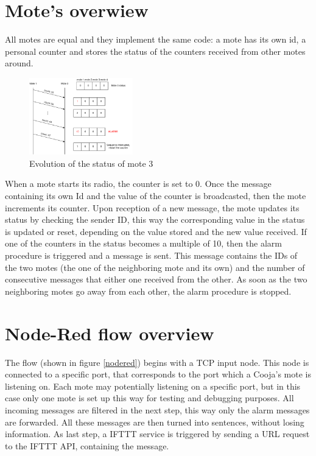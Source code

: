 \documentclass[11pt]{article}
\begin{document}
\section{Mote's overwiew}
All motes are equal and they implement the same code: \newline
a mote has its own id, a personal counter and stores the status of the counters received from other motes around. \newline
\begin{figure}
  \begin{center}
    \includegraphics[width=0.40\textwidth]{status_update_diagram_new.png}
    \caption{Evolution of the status of mote 3}
  \end{center}
\end{figure}
When a mote starts its radio, the counter is set to 0. Once the message containing its own Id and the value of the counter is broadcasted, then the mote increments its counter. \newline
Upon reception of a new message, the mote updates its status by checking the sender ID, this way the corresponding value in the status is updated or reset, depending on the value stored and the new value received. \newline
If one of the counters in the status becomes a multiple of 10, then the alarm procedure is triggered and a message is sent. This message contains the IDs of the two motes (the one of the neighboring mote and its own) and the number of consecutive messages that either one received from the other. \newline
As soon as the two neighboring motes go away from each other, the alarm procedure is stopped.

\section{Node-Red flow overview}
The flow (shown in figure \ref{nodered}) begins with a TCP input node. This node is connected to a specific port, that corresponds to the port which a Cooja's mote is listening on. Each mote may potentially listening on a specific port, but in this case only one mote is set up this way for testing and debugging purposes. \newline
All incoming messages are filtered in the next step, this way only the alarm messages are forwarded. All these messages are then turned into sentences, without losing information. \newline
As last step, a IFTTT service is triggered by sending a URL request to the IFTTT API, containing the message. \newline
\end{document}
